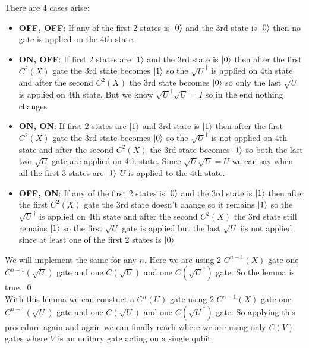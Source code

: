 \documentclass[a4paper, 11pt]{article}
\renewenvironment{proof}{\noindent{\it \textbf{Proof:}}\hspace*{1em}}{\qed\bigskip\\}
\begin{document}
{\begin{proof}
	There are 4 cases arise: \begin{itemize}
		\item \textbf{OFF, OFF}: If any of the first 2 states is  $\ket{0}$ and the 3rd state is $\ket{0}$ then no gate is applied on the 4th state. 
		\item \textbf{ON, OFF}: If first 2 states are $\ket{1}$ and the 3rd state is $\ket{0}$ then after the first $C^2(X)$ gate the 3rd state becomes $\ket{1}$ so the $\sqrt{U}^{\dagger}$ is applied  on 4th state and after the second $C^2(X)$ the 3rd state becomes $\ket{0}$ so only the last $\sqrt{U}$ is applied on 4th state. But we know $\sqrt{U}^{\dagger}\sqrt{U}=I$ so in the end nothing changes
		\item \textbf{ON, ON}: If first 2 states are $\ket{1}$ and 3rd state is $\ket{1}$ then after the first $C^2(X)$ gate the 3rd state becomes $\ket{0}$ so the $\sqrt{U}^{\dagger}$ is not applied  on 4th state and after the second $C^2(X)$ the 3rd state becomes $\ket{1}$ so both  the last two $\sqrt{U}$ gate are applied on 4th state. Since $\sqrt{U}\sqrt{U}=U$ we can say when all the first 3 states are $\ket{1}$ $U$ is applied to the 4th state.
		\item \textbf{OFF, ON}: If any of the first 2 states is $\ket{0}$ and the 3rd state is $\ket{1}$ then after the first $C^2(X)$ gate the 3rd state doesn't change so it remains $\ket{1}$ so the $\sqrt{U}^{\dagger}$ is  applied  on 4th state and after the second $C^2(X)$ the 3rd state still remains  $\ket{1}$ so the first $\sqrt{U}$ gate is applied but the last $\sqrt{U}$ iis not applied since at least one of the first 2 states is $\ket{0}$
	\end{itemize}
	We will implement the same for any $n$. Here we are using 2 $C^{n-1}(X)$ gate one $C^{n-1}(\sqrt{U})$ gate and one $C(\sqrt{U})$ and one $C(\sqrt{U}^{\dagger})$ gate. So the lemma is true.
	\end{proof}
	With this lemma we can constuct a $C^n(U)$ gate using 2 $C^{n-1}(X)$ gate one $C^{n-1}(\sqrt{U})$ gate and one $C(\sqrt{U})$ and one $C(\sqrt{U}^{\dagger})$ gate. So applying this procedure again and again we can finally reach where we are using only $C(V)$ gates where $V$ is an unitary gate acting on a single qubit.
	
}
\end{document}

